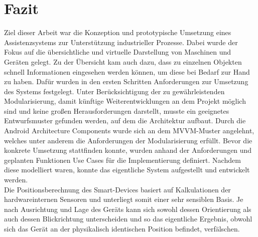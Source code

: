 \chapter{Fazit}
\label{chap:Fazit}
Ziel dieser Arbeit war die Konzeption und prototypische Umsetzung eines Assistenzsystems zur Unterstützung industrieller Prozesse. Dabei wurde der Fokus auf die 
übersichtliche und virtuelle Darstellung von Maschinen und Geräten gelegt. Zu der Übersicht kam auch dazu, dass zu einzelnen Objekten schnell Informationen eingesehen 
werden können, um diese bei Bedarf zur Hand zu haben. Dafür wurden in den ersten Schritten Anforderungen zur Umsetzung des Systems festgelegt. Unter Berücksichtigung der 
zu gewährleistenden Modularisierung, damit künftige Weiterentwicklungen an dem Projekt möglich sind und keine großen Herausforderungen darstellt, musste ein geeignetes 
Entwurfsmuster gefunden werden, auf dem die Architektur aufbaut. Durch die Android Architecture Components wurde sich an dem MVVM-Muster angelehnt, welches unter anderem 
die Anforderungen der Modularisierung erfüllt. Bevor die konkrete Umsetzung stattfinden konnte, wurden anhand der Anforderungen und geplanten Funktionen Use Cases für die 
Implementierung definiert. Nachdem diese modelliert waren, konnte das eigentliche System aufgestellt und entwickelt werden.
\\ 
\linebreak
Die Positionsberechnung des Smart-Devices basiert auf Kalkulationen der hardwareinternen Sensoren und unterliegt somit einer sehr sensiblen Basis. Je nach Ausrichtung und 
Lage des Geräts kann sich sowohl dessen Orientierung als auch dessen Blickrichtung unterscheiden und so das eigentliche Ergebnis, obwohl sich das Gerät an der physikalisch 
identischen Position befindet, verfälschen.  

